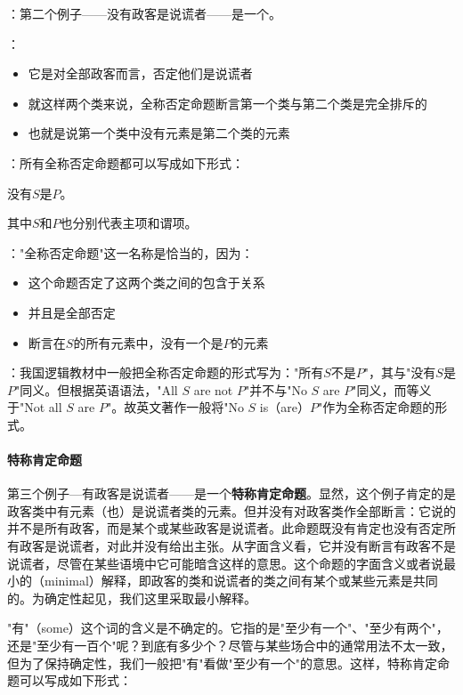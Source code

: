 \begin{examplebox}[title=全称否定命题（E命题）]
：第二个例子——没有政客是说谎者——是一个。

：
\begin{itemize}
  \item 它是对全部政客而言，否定他们是说谎者
  \item 就这样两个类来说，全称否定命题断言第一个类与第二个类是完全排斥的
  \item 也就是说第一个类中没有元素是第二个类的元素
\end{itemize}

：所有全称否定命题都可以写成如下形式：

\begin{center}
没有$S$是$P$。
\end{center}

其中$S$和$P$也分别代表主项和谓项。

："全称否定命题"这一名称是恰当的，因为：
\begin{itemize}
  \item 这个命题否定了这两个类之间的包含于关系
  \item 并且是全部否定
  \item 断言在$S$的所有元素中，没有一个是$P$的元素
\end{itemize}

：我国逻辑教材中一般把全称否定命题的形式写为："所有$S$不是$P$"，其与"没有$S$是$P$"同义。但根据英语语法，"All $S$ are not $P$"并不与"No $S$ are $P$"同义，而等义于"Not all $S$ are $P$"。故英文著作一般将"No $S$ is（are）$P$"作为全称否定命题的形式。
\end{examplebox}

\paragraph{特称肯定命题}
第三个例子—有政客是说谎者——是一个\textbf{特称肯定命题}。显然，这个例子肯定的是政客类中有元素（也）是说谎者类的元素。但并没有对政客类作全部断言：它说的并不是所有政客，而是某个或某些政客是说谎者。此命题既没有肯定也没有否定所有政客是说谎者，对此并没有给出主张。从字面含义看，它并没有断言有政客不是说谎者，尽管在某些语境中它可能暗含这样的意思。这个命题的字面含义或者说最小的（minimal）解释，即政客的类和说谎者的类之间有某个或某些元素是共同的。为确定性起见，我们这里采取最小解释。

"有"（some）这个词的含义是不确定的。它指的是"至少有一个"、"至少有两个"，还是"至少有一百个"呢？到底有多少个？尽管与某些场合中的通常用法不太一致，但为了保持确定性，我们一般把"有"看做"至少有一个"的意思。这样，特称肯定命题可以写成如下形式：

